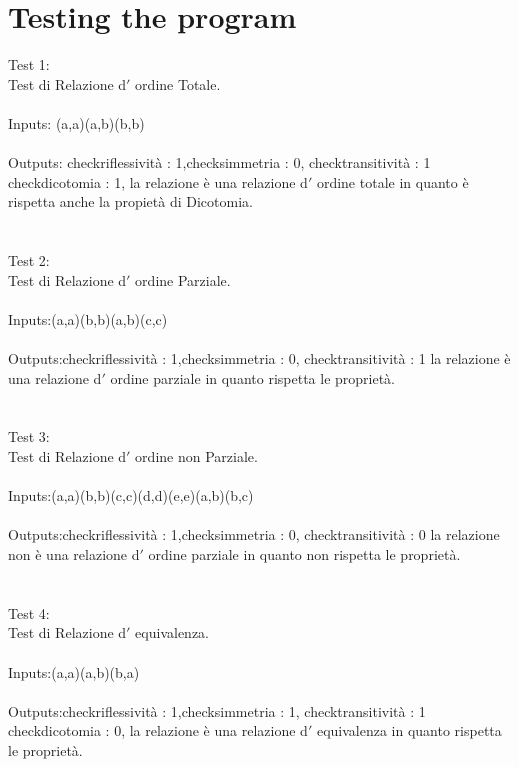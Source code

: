 \documentclass[11pt, a4paper, titlepage, block]{article}
\begin{document}
	\section{Testing the program}
	Test 1:\\
	Test di Relazione d$'$ ordine Totale.\\
	\\
	Inputs: (a,a)(a,b)(b,b)\\
	\\
	Outputs: checkriflessivit\`a : 1,checksimmetria : 0, checktransitivit\`a : 1
	checkdicotomia : 1, la relazione \`e una relazione d$'$ ordine totale in quanto \`e rispetta anche la propiet\`a di Dicotomia.\\
	\\
	\\
	Test 2: \\
	Test di Relazione d$'$ ordine Parziale.\\
	\\
	Inputs:(a,a)(b,b)(a,b)(c,c)\\
	\\
	Outputs:checkriflessivit\`a : 1,checksimmetria : 0, checktransitivit\`a : 1
	la relazione \`e una relazione d$'$ ordine parziale in quanto rispetta le propriet\`a.\\
	\\
	\\
	Test 3: \\
	Test di Relazione d$'$ ordine non Parziale.\\
	\\
	Inputs:(a,a)(b,b)(c,c)(d,d)(e,e)(a,b)(b,c)\\
	\\
	Outputs:checkriflessivit\`a : 1,checksimmetria : 0, checktransitivit\`a : 0
	la relazione non \`e una relazione d$'$ ordine parziale in quanto non rispetta le propriet\`a.\\
	\\
	\\
	Test 4:\\
	Test di Relazione d$'$ equivalenza.\\
	\\
	Inputs:(a,a)(a,b)(b,a)\\
	\\
	Outputs:checkriflessivit\`a : 1,checksimmetria : 1, checktransitivit\`a : 1
	checkdicotomia : 0, la relazione \`e una relazione d$'$ equivalenza in quanto rispetta le propriet\`a.\\
	\\
	\\
\end{document}
